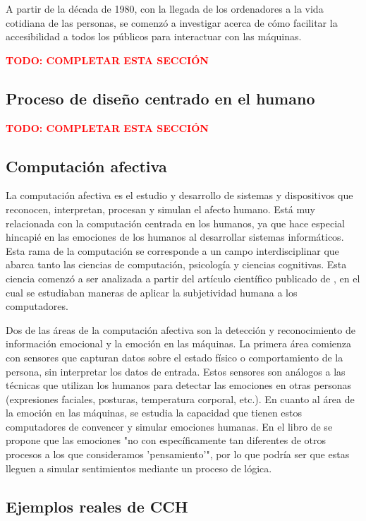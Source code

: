 A partir de la década de 1980, con la llegada de los ordenadores a la vida cotidiana de las personas, se comenzó a investigar acerca de cómo facilitar la accesibilidad a todos los públicos para interactuar con las máquinas.

\textbf{\textcolor{red}{TODO: COMPLETAR ESTA SECCIÓN}}

\subsection{Proceso de diseño centrado en el humano}

\textbf{\textcolor{red}{TODO: COMPLETAR ESTA SECCIÓN}}

\subsection{Computación afectiva}

La computación afectiva es el estudio y desarrollo de sistemas y dispositivos que reconocen, interpretan, procesan y simulan el afecto humano. Está muy relacionada con la computación centrada en los humanos, ya que hace especial hincapié en las emociones de los humanos al desarrollar sistemas informáticos. Esta rama de la computación se corresponde a un campo interdisciplinar que abarca tanto las ciencias de computación, psicología y ciencias cognitivas. Esta ciencia comenzó a ser analizada a partir del artículo científico publicado de \cite{picard1995computer}, en el cual se estudiaban maneras de aplicar la subjetividad humana a los computadores.

Dos de las áreas de la computación afectiva son la detección y reconocimiento de información emocional y la emoción en las máquinas. La primera área comienza con sensores que capturan datos sobre el estado físico o comportamiento de la persona, sin interpretar los datos de entrada. Estos sensores son análogos a las técnicas que utilizan los humanos para detectar las emociones en otras personas (expresiones faciales, posturas, temperatura corporal, etc.). En cuanto al área de la emoción en las máquinas, se estudia la capacidad que tienen estos computadores de convencer y simular emociones humanas. En el libro de \cite{minsky2007emotion} se propone que las emociones "no con específicamente tan diferentes de otros procesos a los que consideramos 'pensamiento'", por lo que podría ser que estas lleguen a simular sentimientos mediante un proceso de lógica.

\subsection{Ejemplos reales de CCH }


